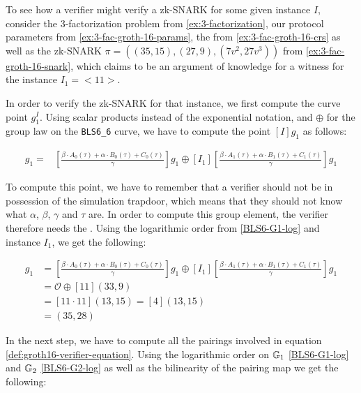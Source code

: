 \begin{example}
\label{3-fac-snark-verifier} To see how a verifier might verify  
a zk-SNARK for some given instance $I$, consider the $3$-factorization problem from \examplename{} \ref{ex:3-factorization}, our protocol parameters from \examplename{} \ref{ex:3-fac-groth-16-params}, the  from \eqref{ex:3-fac-groth-16-crs} as well as the zk-SNARK $\pi=((35,15),(27,9),(7v^2,27v^3))$ from \examplename{}  \eqref{ex:3-fac-groth-16-snark}, which claims to be an argument of knowledge for a witness for the instance $I_1=<11>$.

In order to verify the zk-SNARK for that instance, we first compute the curve point $g_1^I$. Using scalar products instead of the exponential notation, and $\oplus$ for the group law on the \texttt{BLS6\_6} curve, we have to compute the point $[I]g_1$ as follows:

\begin{align*}
[I]g_1 = & [\frac{\beta\cdot A_{0}(\tau)+\alpha\cdot B_{0}(\tau)+C_{0}(\tau)}{\gamma}]g_1 \oplus [I_1][\frac{\beta\cdot A_{1}(\tau)+\alpha\cdot B_{1}(\tau)+C_{1}(\tau)}{\gamma}]g_1
\end{align*}

To compute this point, we have to remember that a verifier should not be in possession of the simulation trapdoor, which means that they should not know what $\alpha$, $\beta$, $\gamma$ and $\tau$ are. In order to compute this group element, the verifier therefore needs the . Using the logarithmic order from \eqref{BLS6-G1-log} and instance $I_1$, we get the following:

\begin{align*}
[I]g_1 & = [\frac{\beta\cdot A_{0}(\tau)+\alpha\cdot B_{0}(\tau)+C_{0}(\tau)}{\gamma}]g_1 \oplus [I_1][\frac{\beta\cdot A_{1}(\tau)+\alpha\cdot B_{1}(\tau)+C_{1}(\tau)}{\gamma}]g_1\\
       & = \mathcal{O} \oplus [11](33,9)\\
       & = [11\cdot 11](13,15) = [4](13,15)\\
       & = (35,28)
\end{align*} 

In the next step, we have to compute all the pairings involved in equation \eqref{def:groth16-verifier-equation}. Using the logarithmic order on $\mathbb{G}_1$ \eqref{BLS6-G1-log} and $\mathbb{G}_2$ \eqref{BLS6-G2-log} as well as the bilinearity of the pairing map we get the following:


\end{example}
